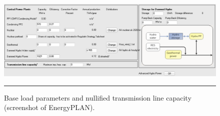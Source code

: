 \begin{figure}[htbp]
	\centering
	\includegraphics[width=\textwidth]{figures/B02_base_load.png}
	\rule{\textwidth}{0.5pt} %
	\caption{Base load parameters and nullified transmission line capacity (screenshot of EnergyPLAN).}
	\label{fig:B02-base_load}
\end{figure}